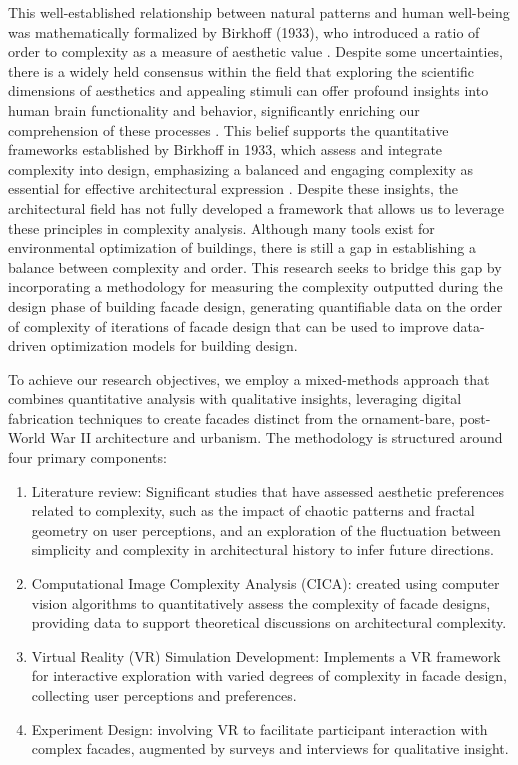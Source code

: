 This well-established relationship between natural patterns and human well-being was mathematically formalized by Birkhoff (1933), who introduced a ratio of order to complexity as a measure of aesthetic value \cite{Birkhoff1933}.
Despite some uncertainties, there is a widely held consensus within the field that exploring the scientific dimensions of aesthetics and appealing stimuli can offer profound insights into human brain functionality and behavior, significantly enriching our comprehension of these processes \cite{Redies2015}.
This belief supports the quantitative frameworks established by Birkhoff in 1933, which assess and integrate complexity into design, emphasizing a balanced and engaging complexity as essential for effective architectural expression \cite{Birkhoff1933}.
Despite these insights, the architectural field has not fully developed a framework that allows us to leverage these principles in complexity analysis.
Although many tools exist for environmental optimization of buildings, there is still a gap in establishing a balance between complexity and order.
This research seeks to bridge this gap by incorporating a methodology for measuring the complexity outputted during the design phase of building facade design, generating quantifiable data on the order of complexity of iterations of facade design that can be used to improve data-driven optimization models for building design.

To achieve our research objectives, we employ a mixed-methods approach that combines quantitative analysis with qualitative insights, leveraging digital fabrication techniques to create facades distinct from the ornament-bare, post-World War II architecture and urbanism.
The methodology is structured around four primary components:


\begin{enumerate}
    \item Literature review: Significant studies that have assessed aesthetic preferences related to complexity, such as the impact of chaotic patterns and fractal geometry on user perceptions, and an exploration of the fluctuation between simplicity and complexity in architectural history to infer future directions.
    \item Computational Image Complexity Analysis (CICA): created using computer vision algorithms to quantitatively assess the complexity of facade designs, providing data to support theoretical discussions on architectural complexity.
    \item Virtual Reality (VR) Simulation Development: Implements a VR framework for interactive exploration with varied degrees of complexity in facade design, collecting user perceptions and preferences.
    \item Experiment Design: involving VR to facilitate participant interaction with complex facades, augmented by surveys and interviews for qualitative insight.
\end{enumerate}

